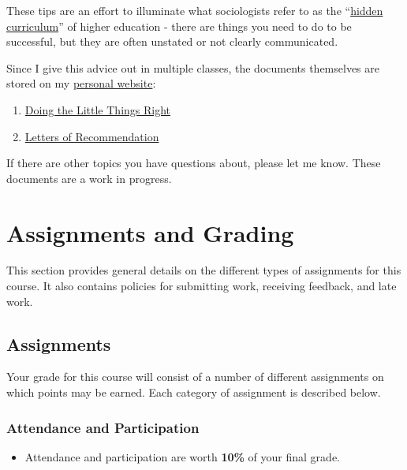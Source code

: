 \documentclass[
]{book}
\providecommand{\tightlist}{%
  \setlength{\itemsep}{0pt}\setlength{\parskip}{0pt}}
\newenvironment{rmdblock}[1]
  {\begin{shaded*}
  \begin{itemize}
  \renewcommand{\labelitemi}{
    \raisebox{-.7\height}[0pt][0pt]{
      {\setkeys{Gin}{width=3em,keepaspectratio}\texttt{[image: images/\#1]}}
    }
  }
  \item
  }
  {
  \end{itemize}
  \end{shaded*}
  }
\newenvironment{rmdtip}
  {\begin{rmdblock}{tip}}
  {\end{rmdblock}}
\begin{document}
These tips are an effort to illuminate what sociologists refer to as the ``\href{https://books.google.com/books?hl=en\&lr=\&id=5r-TAgAAQBAJ\&oi=fnd\&pg=PP1\&dq=hidden+curriculum\#v=onepage\&q=hidden\%20curriculum\&f=false}{hidden curriculum}'' of higher education - there are things you need to do to be successful, but they are often unstated or not clearly communicated.

Since I give this advice out in multiple classes, the documents themselves are stored on my \href{https://chris-prener.github.io}{personal website}:

\begin{enumerate}
\def\labelenumi{\arabic{enumi}.}
\tightlist
\item
  \href{https://chris-prener.github.io/resources/students/little-things/}{Doing the Little Things Right}
\item
  \href{https://chris-prener.github.io/resources/students/letters/}{Letters of Recommendation}
\end{enumerate}

If there are other topics you have questions about, please let me know. These documents are a work in progress.

\hypertarget{assignments-and-grading}{%
\chapter{Assignments and Grading}\label{assignments-and-grading}}

This section provides general details on the different types of assignments for this course. It also contains policies for submitting work, receiving feedback, and late work.

\hypertarget{assignments}{%
\section{Assignments}\label{assignments}}

Your grade for this course will consist of a number of different assignments on which points may be earned. Each category of assignment is described below.

\hypertarget{attendance-and-participation-1}{%
\subsection{Attendance and Participation}\label{attendance-and-participation-1}}

\begin{rmdtip}
Attendance and participation are worth \textbf{10\%} of your final
grade.
\end{rmdtip}
\end{document}
